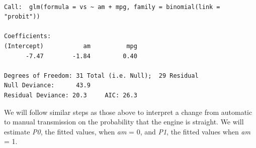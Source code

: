 \documentclass[]{book}
\newenvironment{Shaded}{\begin{snugshade}}{\end{snugshade}}
\newcommand{\CommentTok}[1]{\textcolor[rgb]{0.56,0.35,0.01}{\textit{#1}}}
\newcommand{\DataTypeTok}[1]{\textcolor[rgb]{0.13,0.29,0.53}{#1}}
\newcommand{\DecValTok}[1]{\textcolor[rgb]{0.00,0.00,0.81}{#1}}
\newcommand{\KeywordTok}[1]{\textcolor[rgb]{0.13,0.29,0.53}{\textbf{#1}}}
\newcommand{\NormalTok}[1]{#1}
\newcommand{\OperatorTok}[1]{\textcolor[rgb]{0.81,0.36,0.00}{\textbf{#1}}}
\newcommand{\StringTok}[1]{\textcolor[rgb]{0.31,0.60,0.02}{#1}}
\begin{document}
\begin{Shaded}
\end{Shaded}

\begin{verbatim}

Call:  glm(formula = vs ~ am + mpg, family = binomial(link = "probit"))

Coefficients:
(Intercept)           am          mpg  
      -7.47        -1.84         0.40  

Degrees of Freedom: 31 Total (i.e. Null);  29 Residual
Null Deviance:      43.9 
Residual Deviance: 20.3     AIC: 26.3
\end{verbatim}

We will follow similar steps as those above to interpret a change from automatic to manual transmission on the probability that the engine is straight. We will estimate \emph{P0}, the fitted values, when \emph{am} = 0, and \emph{P1}, the fitted values when \emph{am} = 1.

\begin{Shaded}
\end{Shaded}
\end{document}
